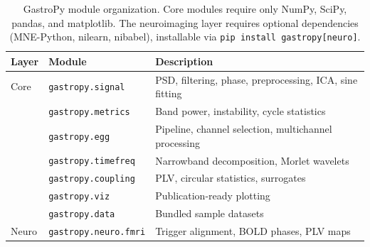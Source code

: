 \documentclass[12pt]{article}
\begin{document}
\begin{table}[htbp]
\centering
\caption{GastroPy module organization. Core modules require only NumPy, SciPy,
  pandas, and matplotlib. The neuroimaging layer requires optional dependencies
  (MNE-Python, nilearn, nibabel), installable via
  \texttt{pip install gastropy[neuro]}.}
\label{tab:modules}
\begin{tabular}{lll}
\toprule
\textbf{Layer} & \textbf{Module} & \textbf{Description} \\
\midrule
Core & \texttt{gastropy.signal} & PSD, filtering, phase, preprocessing, ICA, sine fitting \\
     & \texttt{gastropy.metrics} & Band power, instability, cycle statistics \\
     & \texttt{gastropy.egg} & Pipeline, channel selection, multichannel processing \\
     & \texttt{gastropy.timefreq} & Narrowband decomposition, Morlet wavelets \\
     & \texttt{gastropy.coupling} & PLV, circular statistics, surrogates \\
     & \texttt{gastropy.viz} & Publication-ready plotting \\
     & \texttt{gastropy.data} & Bundled sample datasets \\
\midrule
Neuro & \texttt{gastropy.neuro.fmri} & Trigger alignment, BOLD phases, PLV maps \\
\bottomrule
\end{tabular}
\end{table}
\end{document}
